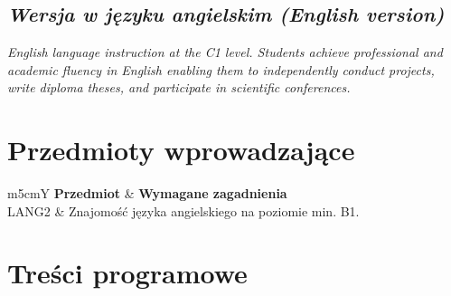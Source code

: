 \documentclass[12pt, a4paper]{article}
\newcommand{\thdrule}{\noalign{\global\setlength{\extrarowheight}{0pt}}}
\newcommand{\thdend}{\noalign{\global\setlength{\extrarowheight}{3pt}}}
\begin{document}
\subsection*{\textit{Wersja w języku angielskim (English version)}}

\textit{English language instruction at the C1 level. Students achieve professional and academic fluency in English enabling them to independently conduct projects, write diploma theses, and participate in scientific conferences.}


\section{Przedmioty wprowadzające}

{\scriptsize
\begin{tabularx}{\textwidth}{m{5cm}Y}
\thdrule\toprule
{} {\color{white}\textbf{Przedmiot}} & {\color{white}\textbf{Wymagane zagadnienia}} \\
\midrule\thdend
   LANG2 & Znajomość języka angielskiego na poziomie min. B1. \\
\bottomrule
\end{tabularx}}

\section{Treści programowe}
\end{document}
